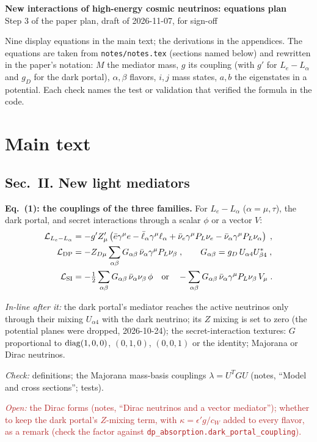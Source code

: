 \documentclass[11pt]{article}
\newcommand{\checked}[1]{\par\noindent\textit{Check:} #1}
\newcommand{\inline}[1]{\par\noindent\textit{In-line after it:} #1}
\newcommand{\open}[1]{\par\noindent\textcolor{firebrick}{\textit{Open:} #1}}
\begin{document}
\begin{center}
{\large\bfseries New interactions of high-energy cosmic neutrinos: equations plan}\\[2pt]
Step 3 of the paper plan, draft of 2026-11-07, for sign-off
\end{center}

Nine display equations in the main text; the derivations in the appendices.
The equations are taken from \texttt{notes/notes.tex} (sections named below) and rewritten in the paper's notation: $M$ the mediator mass, $g$ its coupling (with $g'$ for $L_e - L_\alpha$ and $g_D$ for the dark portal), $\alpha, \beta$ flavors, $i, j$ mass states, $a, b$ the eigenstates in a potential.
Each check names the test or validation that verified the formula in the code.

\section*{Main text}

\subsection*{Sec.~II. New light mediators}

\textbf{Eq.~(1): the couplings of the three families.}
For $L_e - L_\alpha$ ($\alpha = \mu, \tau$), the dark portal, and secret interactions through a scalar $\phi$ or a vector $V$:
\begin{align}
 \mathcal{L}_{L_e - L_\alpha} &= -g' Z'_\mu \left( \bar e \gamma^\mu e - \bar\ell_\alpha \gamma^\mu \ell_\alpha
   + \bar\nu_e \gamma^\mu P_L \nu_e - \bar\nu_\alpha \gamma^\mu P_L \nu_\alpha \right) \;, \nonumber \\
 \mathcal{L}_{\rm DP} &= -Z_{D\mu} \sum_{\alpha\beta} G_{\alpha\beta}\, \bar\nu_\alpha \gamma^\mu P_L \nu_\beta \;, \qquad
   G_{\alpha\beta} = g_D\, U_{\alpha 4} U^*_{\beta 4} \;, \nonumber \\
 \mathcal{L}_{\rm SI} &= -\tfrac12 \sum_{\alpha\beta} G_{\alpha\beta}\, \bar\nu_\alpha \nu_\beta\, \phi
   \quad \text{or} \quad -\sum_{\alpha\beta} G_{\alpha\beta}\, \bar\nu_\alpha \gamma^\mu P_L \nu_\beta\, V_\mu \;.
\end{align}
\inline{the dark portal's mediator reaches the active neutrinos only through their mixing $U_{\alpha 4}$ with the dark neutrino; its $Z$ mixing is set to zero (the potential planes were dropped, 2026-10-24); the secret-interaction textures: $G$ proportional to ${\rm diag}(1,0,0)$, $(0,1,0)$, $(0,0,1)$ or the identity; Majorana or Dirac neutrinos.}
\checked{definitions; the Majorana mass-basis couplings $\lambda = U^T G U$ (notes, ``Model and cross sections''; tests).}
\open{the Dirac forms (notes, ``Dirac neutrinos and a vector mediator''); whether to keep the dark portal's $Z$-mixing term, with $\kappa = \epsilon' g / c_W$ added to every flavor, as a remark (check the factor against \texttt{dp\_absorption.dark\_portal\_coupling}).}
\end{document}

